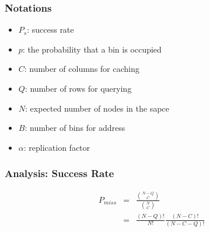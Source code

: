 \documentclass[red]{beamer}
\begin{document}

\begin{frame}
\frametitle{Notations}
\begin{itemize}
\item $P_s$: success rate
\item $p$: the probability that a bin is occupied
\item $C$: number of columns for caching
\item $Q$: number of rows for querying
\item $N$: expected number of nodes in the sapce
\item $B$: number of bins for address
\item $\alpha$: replication factor
\end{itemize}
\end{frame}
\begin{frame}
\frametitle{Analysis: Success Rate}
\small{
\begin{eqnarray}
P_{miss} &=& \frac{{{N-Q}\choose{C}}}{{{N}\choose{C}}}\\
         &=& \frac{(N-Q)!}{N!}\frac{(N-C)!}{(N-C-Q)!}
\end{eqnarray}
}
\end{frame}
\end{document}

